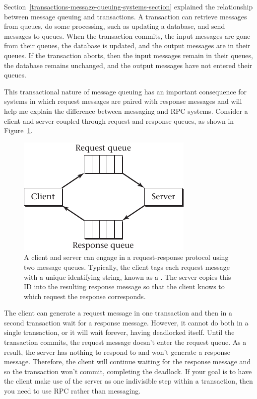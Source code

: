 Section~\ref{transactions-message-queuing-systems-section} explained
the relationship between message queuing and transactions.  A
transaction can retrieve messages from queues, do some processing, such
as updating a database, and send messages to queues.  When the
transaction commits, the input messages are gone from their queues,
the database is updated, and the output messages are in their queues.
If the transaction aborts, then the input messages remain in their
queues, the database remains unchanged, and the output messages have
not entered their queues.

This transactional nature of message queuing has an important
consequence for systems in which request messages are paired with
response messages and will help me explain the difference between
messaging and RPC systems.  Consider a client and server coupled
through request and response queues, as shown in
Figure~\ref{scan-10-2}.
\begin{figure}
\centerline{\includegraphics{hail_f1002}}
\caption{A client and server can engage in a request-response protocol
  using two message queues.  Typically, the client tags each request
  message with a unique identifying string, known as a
  .  The server copies this ID into the
  resulting response message so that the client knows to which request
  the response corresponds.}
\label{scan-10-2}
\end{figure}
The client can generate a request message in one transaction and then
in a second transaction wait for a response message.  However, it
cannot do both in a single transaction, or it will wait forever,
having deadlocked itself.  Until the transaction commits, the request
message doesn't enter the request queue. As a result, the server has
nothing to respond to and won't generate a response message.
Therefore, the client will continue waiting for the response message
and so the transaction won't commit, completing the deadlock.  If
your goal is to have the client make use of the server as one
indivisible step within a transaction, then you need to use RPC rather
than messaging.

